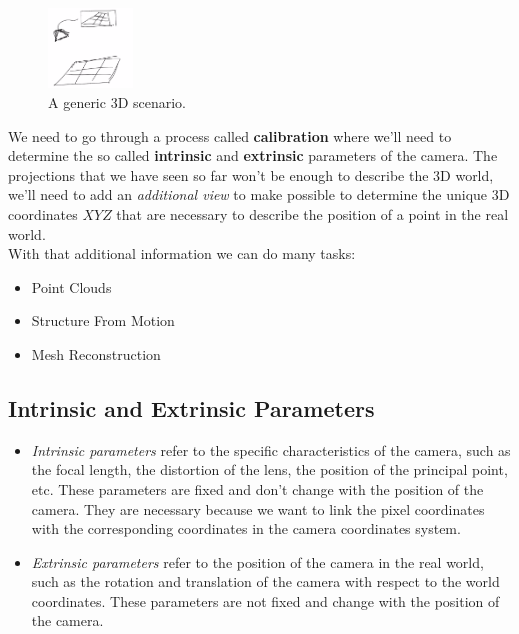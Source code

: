 \begin{figure}[h!]
    \centering
    \includegraphics[width=0.2\textwidth]{Figures/3d.png}
    \caption{A generic 3D scenario.}
    \label{fig:3d}
\end{figure}

We need to go through a process called \textbf{calibration} where we'll need to determine the so called \textbf{intrinsic} and \textbf{extrinsic} parameters of the camera. The projections that we have seen so far won't be enough to describe the 3D world, we'll need to add an \textit{additional view} to make possible to determine the unique 3D coordinates \(X Y Z\) that are necessary to describe the position of a point in the real world. 
\\With that additional information we can do many tasks:
\begin{itemize} 
    \item Point Clouds
    \item Structure From Motion
    \item Mesh Reconstruction
\end{itemize}

\subsection{Intrinsic and Extrinsic Parameters}

\begin{itemize} 
    \item\textit{Intrinsic parameters} refer to the specific characteristics of the camera, such as the focal length, the distortion of the lens, the position of the principal point, etc. These parameters are fixed and don't change with the position of the camera. They are necessary because we want to link the pixel coordinates with the corresponding coordinates in the camera coordinates system.

    \item\textit{Extrinsic parameters} refer to the position of the camera in the real world, such as the rotation and translation of the camera with respect to the world coordinates. These parameters are not fixed and change with the position of the camera.
\end{itemize}

